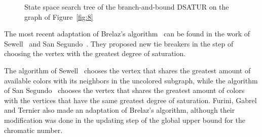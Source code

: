 \documentclass[fleqn,10pt]{SelfArx} %
\begin{document}
\begin{figure*}[h]
		
		\caption{State space search tree of the branch-and-bound \textsf{DSATUR} on the graph of Figure~\ref{fig:8}}\label{fig:9}
	\end{figure*}
	
	The most recent adaptation of Brelaz's algorithm~\cite{Brelaz79} can
	be found in the work of Sewell~\cite{Sewell1996} and San Segundo~\cite{SanSegundo2012}. They proposed new tie breakers in the
	step of choosing the vertex with the greatest degree of
	saturation. 
	
	The algorithm of Sewell~\cite{Sewell1996} chooses the
	vertex that shares the greatest amount of available colors with its
	neighbors in the uncolored subgraph, while the algorithm of San Segundo~\cite{SanSegundo2012} chooses the vertex that shares the
	greatest amount of colors with the vertices that have the same
	greatest degree of saturation.
	Furini, Gabrel and Ternier\cite{Furini2017} also made an adaptation of Brelaz's
	algorithm, although their modification was done in the updating step of the global upper bound for the chromatic number.
	
\end{document}
